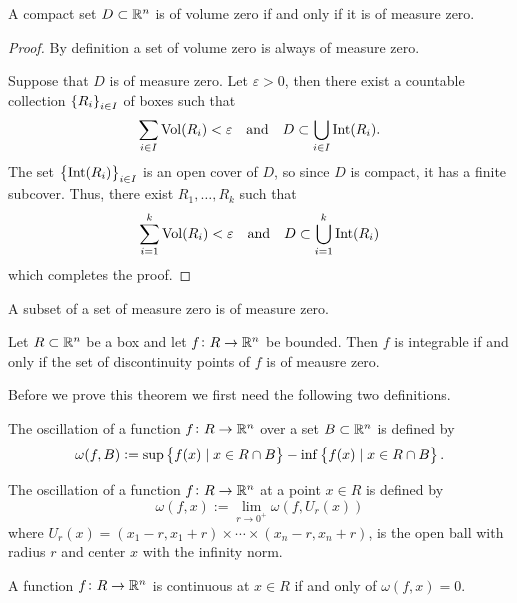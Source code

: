 \documentclass[11pt,a4paper]{article}
\begin{document}
\begin{theorem}
  A compact set $D \subset \mathbb{R}^n$ is of volume zero if and only
  if it is of measure zero.
\end{theorem}
\begin{proof}
  By definition a set of volume zero is always of measure zero.

  Suppose that $D$ is of measure zero.
  Let $\varepsilon > 0$, then there exist a countable collection
  $\left\{R_i\right\}_{i \in I}$ of boxes such that
  \[
    \sum_{i \in I} \operatorname{Vol}(R_i) < \varepsilon
    \quad \text{and} \quad
    D \subset \bigcup_{i \in I} \operatorname{Int}(R_i).
  \]
  The set $\left\{\operatorname{Int}(R_i)\right\}_{i \in I}$ is an open cover of $D$,
  so since $D$ is compact, it has a finite subcover.
  Thus, there exist $R_1,\dots,R_k$ such that
  \[
    \sum_{i=1}^{k} \operatorname{Vol}(R_i) < \varepsilon
    \quad \text{and} \quad
    D \subset \bigcup_{i=1}^{k}{\operatorname{Int}(R_i)}
  \]
  which completes the proof.
\end{proof}

\begin{remark}
  A subset of a set of measure zero is of measure zero.
\end{remark}

\begin{theorem}
  \label{thm:lebesgue}
  Let $R \subset \mathbb{R}^n$ be a box and let $f \colon R \to \mathbb{R}^n$ be bounded.
  Then $f$ is integrable if and only if the set of discontinuity points
  of $f$ is of meausre zero.
\end{theorem}

Before we prove this theorem we first need the following two definitions.

\begin{definition}
  The oscillation of a function $f \colon R \to \mathbb{R}^n$
  over a set $B \subset \mathbb{R}^n$ is defined by
  \[
    \omega(f,B) := 
    \sup\left\{f(x) \mid x \in R \cap B\right\} -
    \inf\left\{f(x) \mid x \in R \cap B\right\}.
  \]
\end{definition}

\begin{definition}
  The oscillation of a function $f \colon R \to \mathbb{R}^n$
  at a point $x \in R$ is defined by
  \[
    \omega(f,x) := \lim_{r \to 0^+} \omega(f,U_r(x))
  \]
  where $U_r(x) = (x_1-r,x_1+r) \times \cdots \times (x_n-r,x_n+r)$,
  is the open ball with radius $r$ and center $x$ with the
  infinity norm.
\end{definition}

\begin{lemma}
  A function $f \colon R \to \mathbb{R}^n$
  is continuous at $x \in R$ if and only of $\omega(f,x) = 0$.
\end{lemma}
\end{document}

